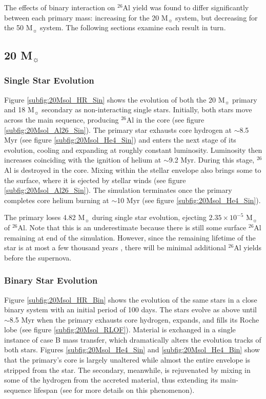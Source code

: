 The effects of binary interaction on $^{26}$Al yield was found to differ significantly between each primary mass: increasing for the 20 M$_{\sun}$ system, but decreasing for the 50 M$_{\sun}$ system.
The following sections examine each result in turn.

\subsection{20 M$_{\sun}$} \label{20Msol}

\subsubsection{Single Star Evolution}

Figure \ref{subfig:20Msol_HR_Sin} shows the evolution of both the 20 M$_{\sun}$ primary and 18 M$_{\sun}$ secondary as non-interacting single stars.
Initially, both stars move across the main sequence, producing $^{26}$Al in the core (see figure \ref{subfig:20Msol_Al26_Sin}).
The primary star exhausts core hydrogen at $\sim$8.5 Myr (see figure \ref{subfig:20Msol_He4_Sin}) and enters the next stage of its evolution, cooling and expanding at roughly constant luminosity.
Luminosity then increases coinciding with the ignition of helium at $\sim$9.2 Myr.
During this stage, $^{26}$Al is destroyed in the core. Mixing within the stellar envelope also brings some to the surface, where it is ejected by stellar winds (see figure \ref{subfig:20Msol_Al26_Sin}).
The simulation terminates once the primary completes core helium burning at $\sim$10 Myr (see figure \ref{subfig:20Msol_He4_Sin}).

The primary loses 4.82 M$_{\sun}$ during single star evolution, ejecting $2.35\times10^{-5}$ M$_{\sun}$ of $^{26}$Al. Note that this is an underestimate because there is still some surface $^{26}$Al remaining at end of the simulation.
However, since the remaining lifetime of the star is at most a few thousand years \citep{Iliadis2015}, there will be minimal additional $^{26}$Al yields before the supernova.

\subsubsection{Binary Star Evolution}

Figure \ref{subfig:20Msol_HR_Bin} shows the evolution of the same stars in a close binary system with an initial period of 100 days.
The stars evolve as above until $\sim$8.5 Myr when the primary exhausts core hydrogen, expands, and fills its Roche lobe (see figure \ref{subfig:20Msol_RLOF}).
Material is exchanged in a single instance of case B mass transfer, which dramatically alters the evolution tracks of both stars.
Figures \ref{subfig:20Msol_He4_Sin} and \ref{subfig:20Msol_He4_Bin} show that the primary's core is largely unaltered while almost the entire envelope is stripped from the star.
The secondary, meanwhile, is rejuvenated by mixing in some of the hydrogen from the accreted material, thus extending its main-sequence lifespan (see \cite{2007MNRAS.376...61D} for more details on this phenomenon).

